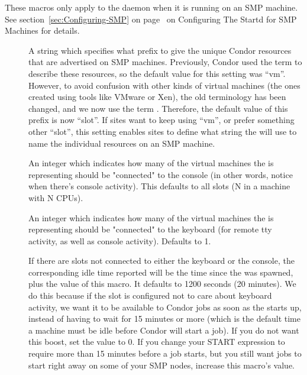 These macros only apply to the  daemon when it is running on an
SMP machine. 
See section~\ref{sec:Configuring-SMP} on
page~\pageref{sec:Configuring-SMP} on Configuring The Startd for 
SMP Machines for details.

\begin{description}

\item[] 
\label{param:StartdResourcePrefix}
  A string which specifies what prefix to give the unique Condor
  resources that are advertised on SMP machines.
  Previously, Condor used the term  to describe
  these resources, so the default value for this setting was ``vm''.
  However, to avoid confusion with other kinds of virtual machines
  (the ones created using tools like VMware or Xen), the old
   terminology has been changed, and we now use
  the term .
  Therefore, the default value of this prefix is now ``slot''.
  If sites want to keep using ``vm'', or prefer something other
  ``slot'', this setting enables sites to define what string the
   will use to name the individual resources on an SMP
  machine.

\item[] 
\label{param:SlotsConnectedToConsole}
  An integer which indicates how many of the virtual
  machines the  is representing should be "connected" to the
  console (in other words, notice when there's console activity).
  This defaults to all slots (N in a machine with N CPUs).

\item[]
\label{param:SlotsConnectedToKeyboard}
  An integer which indicates how many of the virtual
  machines the  is representing should be "connected" to the
  keyboard (for remote tty activity, as well as console activity).
  Defaults to 1.

\item[]
\label{param:DisconnectedKeyboardIdleBoost}
  If there are slots not connected to either the keyboard
  or the console, the corresponding idle time reported will be the
  time since the  was spawned, plus the value of this macro.
  It defaults to 1200 seconds (20 minutes). 
  We do this because if the slot is configured not to care
  about keyboard activity, we want it to be available to Condor jobs
  as soon as the  starts up, instead of having to wait for 15
  minutes or more (which is the default time a machine must be idle
  before Condor will start a job).
  If you do not want this boost, set the value to 0.  
  If you change your START expression to require more than 15 minutes
  before a job starts, but you still want jobs to start right away on
  some of your SMP nodes, increase this macro's value.


\end{description}
